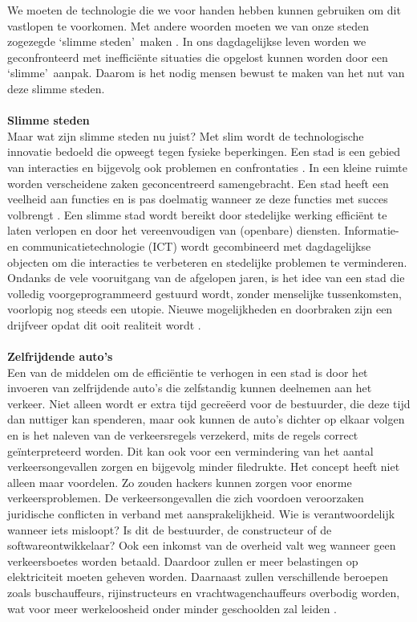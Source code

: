 \documentclass[a4paper,kulak]{kulakarticle}
\begin{document}
We moeten de technologie die we voor handen hebben kunnen gebruiken om dit vastlopen te voorkomen. Met andere woorden moeten we van onze steden zogezegde  \lq slimme steden\rq\  maken \cite{taaladvies}. In ons dagdagelijkse leven worden we geconfronteerd met inefficiënte situaties die opgelost kunnen worden door een \lq slimme\rq\ aanpak. Daarom is het nodig mensen bewust te maken van het nut van deze slimme steden.\\ \\
\textbf{\large Slimme steden} \\
Maar wat zijn slimme steden nu juist? Met slim wordt de technologische innovatie bedoeld die opweegt tegen fysieke beperkingen. Een stad is een gebied van interacties en bijgevolg ook problemen en confrontaties \cite{sc}. In een kleine ruimte worden verscheidene zaken geconcentreerd samengebracht. Een stad heeft een veelheid aan functies en is pas doelmatig  wanneer ze deze functies met succes volbrengt \cite{synoniemen}. Een slimme stad wordt bereikt door stedelijke werking efficiënt te laten verlopen en door het vereenvoudigen van (openbare) diensten. Informatie- en communicatietechnologie (ICT) wordt gecombineerd met dagdagelijkse objecten om die interacties te verbeteren en stedelijke problemen te verminderen. Ondanks de vele vooruitgang van de afgelopen jaren, is het idee van een stad die volledig voorgeprogrammeerd gestuurd wordt, zonder menselijke tussenkomsten, voorlopig nog steeds een utopie. Nieuwe mogelijkheden en doorbraken zijn een drijfveer opdat dit ooit realiteit wordt \cite{proconsc}.\\ \\
\textbf{\large Zelfrijdende auto's} \\
Een van de middelen om de efficiëntie te verhogen in een stad is door het invoeren van zelfrijdende auto's die zelfstandig kunnen deelnemen aan het verkeer. Niet alleen wordt er extra tijd gecreëerd voor de bestuurder, die deze tijd dan nuttiger kan spenderen, maar ook kunnen de auto's dichter op elkaar volgen en is het naleven van de verkeersregels verzekerd, mits de regels correct geïnterpreteerd worden. Dit kan ook voor een vermindering van het aantal verkeersongevallen zorgen en bijgevolg minder filedrukte. Het concept heeft niet alleen maar voordelen. Zo zouden hackers kunnen zorgen voor enorme verkeersproblemen. De verkeersongevallen die zich voordoen veroorzaken juridische conflicten in verband met aansprakelijkheid. Wie is verantwoordelijk wanneer iets misloopt? Is dit de bestuurder, de constructeur of de softwareontwikkelaar? Ook een inkomst van de overheid valt weg wanneer geen verkeersboetes worden betaald. Daardoor zullen er meer belastingen op elektriciteit moeten geheven worden. Daarnaast zullen verschillende beroepen zoals buschauffeurs, rijinstructeurs en vrachtwagenchauffeurs overbodig worden, wat voor meer werkeloosheid onder minder geschoolden zal leiden \cite{procontracars}.
\end{document}
